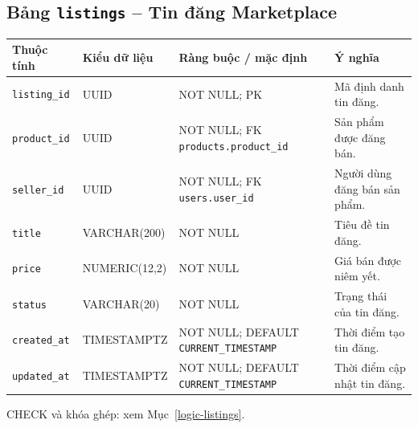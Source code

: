 \subsection{Bảng \texttt{listings} -- Tin đăng Marketplace}
\label{dictionary-listings}
\begingroup
\footnotesize
\setlength{\tabcolsep}{3pt}
\begin{longtable}{>{\raggedright\arraybackslash}p{3.1cm}>{\raggedright\arraybackslash}p{2.5cm}>{\raggedright\arraybackslash}p{3.7cm}>{\raggedright\arraybackslash}p{4.3cm}}
\toprule
Thuộc tính & Kiểu dữ liệu & Ràng buộc / mặc định & Ý nghĩa \\
\midrule
\endhead
\texttt{listing\_\allowbreak{}id} & UUID & NOT NULL; PK & Mã định danh tin đăng. \\
\texttt{product\_\allowbreak{}id} & UUID & NOT NULL; FK \texttt{products.product\_\allowbreak{}id} & Sản phẩm được đăng bán. \\
\texttt{seller\_\allowbreak{}id} & UUID & NOT NULL; FK \texttt{users.user\_\allowbreak{}id} & Người dùng đăng bán sản phẩm. \\
\texttt{title} & VARCHAR(200) & NOT NULL & Tiêu đề tin đăng. \\
\texttt{price} & NUMERIC(12,2) & NOT NULL & Giá bán được niêm yết. \\
\texttt{status} & VARCHAR(20) & NOT NULL & Trạng thái của tin đăng. \\
\texttt{created\_\allowbreak{}at} & TIMESTAMPTZ & NOT NULL; DEFAULT \texttt{CURRENT\_\allowbreak{}TIMESTAMP} & Thời điểm tạo tin đăng. \\
\texttt{updated\_\allowbreak{}at} & TIMESTAMPTZ & NOT NULL; DEFAULT \texttt{CURRENT\_\allowbreak{}TIMESTAMP} & Thời điểm cập nhật tin đăng. \\
\bottomrule
\end{longtable}
\endgroup
CHECK và khóa ghép: xem Mục~\ref{logic-listings}.
